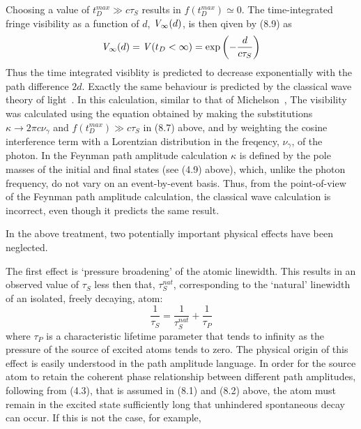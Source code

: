 \documentclass [12pt]{article}
\begin{document}
{    \par Choosing a value of $t_D^{max} \gg c \tau_S$ results in $f(t_D^{max})\simeq 0$. The time-integrated
    fringe visibility as a function of $d$, ${\it V}_{\infty}(d)$, is then qiven 
    by (8.9) as 
    \begin{equation}
    {\it V}_{\infty}(d) = {\it V}(t_D < \infty ) = \exp\left(-\frac{d}{c \tau_S}\right)
    \end{equation} 
     Thus the time integrated visiblity is predicted to decrease exponentially with the path
    difference $2d$. Exactly the same behaviour is predicted by the classical wave theory of
    light~\cite{MW3}. In this calculation, similar to that of Michelson~\cite{Michelson1},
    The visibility was calculated using the equation obtained by making the 
    substitutions $\kappa \rightarrow 2 \pi c \nu_{\gamma}$ and  $f(t_D^{max}) \gg c\tau_S$
   in (8.7) above, and by weighting the cosine interference term with
   a Lorentzian distribution in the freqency, $\nu_{\gamma}$, of the photon. 
     In the Feynman path amplitude calculation $\kappa$ is defined by the pole masses
    of the initial and final states (see (4.9) above), which, unlike the photon
    frequency, do not vary on an event-by-event basis. Thus, from the point-of-view of
    the Feynman path amplitude calculation, the classical wave calculation is incorrect,
    even though it predicts the same result.
    \par In the above treatment, two potentially important physical effects have been neglected.
    \par The first effect is `pressure broadening' of the atomic linewidth. This results in an observed
    value of $\tau_S$ less then that, $\tau_S^{nat}$, corresponding to the `natural' linewidth of
    an isolated, freely decaying, atom:
      \begin{equation}
       \frac{1}{\tau_S}=  \frac{1}{\tau_S^{nat}}+ \frac{1}{\tau_P}
     \end{equation}
      where $\tau_P$ is a characteristic lifetime parameter that tends to infinity as the 
      pressure of the source of excited atoms tends to zero. The physical origin of this effect
    is easily understood in the path amplitude language. In order for the source atom to retain
     the coherent phase relationship between different path amplitudes, following from
      (4.3), that is assumed in (8.1) and (8.2) above, the atom must remain in the excited state sufficiently
      long that unhindered spontaneous decay can occur. If this is not the case, for example,
}
\end{document}
